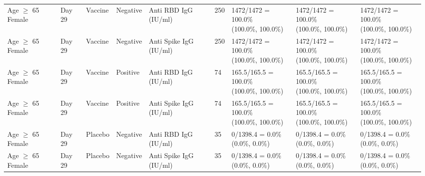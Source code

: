 \documentclass[]{book}
\theoremstyle{definition}
\theoremstyle{definition}
\theoremstyle{definition}
\newcommand{\1}{\mathbbm{1}}
\begin{document}
\begin{landscape}
\begin{ThreePartTable}
\begin{longtable}[t]{>{\raggedright\arraybackslash}p{2.7cm}llllllll}
\hspace{1em}Age $\geq$ 65 Female & Day 29 & Vaccine & Negative & Anti RBD IgG (IU/ml) & 250 & \makecell[l]{1472/1472 = 100.0\%\\(100.0\%, 100.0\%)} & \makecell[l]{1472/1472 = 100.0\%\\(100.0\%, 100.0\%)} & \makecell[l]{1472/1472 = 100.0\%\\(100.0\%, 100.0\%)}\\
\hspace{1em}Age $\geq$ 65 Female & Day 29 & Vaccine & Negative & Anti Spike IgG (IU/ml) & 250 & \makecell[l]{1472/1472 = 100.0\%\\(100.0\%, 100.0\%)} & \makecell[l]{1472/1472 = 100.0\%\\(100.0\%, 100.0\%)} & \makecell[l]{1472/1472 = 100.0\%\\(100.0\%, 100.0\%)}\\
\hspace{1em}Age $\geq$ 65 Female & Day 29 & Vaccine & Positive & Anti RBD IgG (IU/ml) & 74 & \makecell[l]{165.5/165.5 = 100.0\%\\(100.0\%, 100.0\%)} & \makecell[l]{165.5/165.5 = 100.0\%\\(100.0\%, 100.0\%)} & \makecell[l]{165.5/165.5 = 100.0\%\\(100.0\%, 100.0\%)}\\
\hspace{1em}Age $\geq$ 65 Female & Day 29 & Vaccine & Positive & Anti Spike IgG (IU/ml) & 74 & \makecell[l]{165.5/165.5 = 100.0\%\\(100.0\%, 100.0\%)} & \makecell[l]{165.5/165.5 = 100.0\%\\(100.0\%, 100.0\%)} & \makecell[l]{165.5/165.5 = 100.0\%\\(100.0\%, 100.0\%)}\\
\hspace{1em}Age $\geq$ 65 Female & Day 29 & Placebo & Negative & Anti RBD IgG (IU/ml) & 35 & \makecell[l]{0/1398.4 = 0.0\%\\(0.0\%, 0.0\%)} & \makecell[l]{0/1398.4 = 0.0\%\\(0.0\%, 0.0\%)} & \makecell[l]{0/1398.4 = 0.0\%\\(0.0\%, 0.0\%)}\\
\hspace{1em}Age $\geq$ 65 Female & Day 29 & Placebo & Negative & Anti Spike IgG (IU/ml) & 35 & \makecell[l]{0/1398.4 = 0.0\%\\(0.0\%, 0.0\%)} & \makecell[l]{0/1398.4 = 0.0\%\\(0.0\%, 0.0\%)} & \makecell[l]{0/1398.4 = 0.0\%\\(0.0\%, 0.0\%)}\\

\end{longtable}
\end{ThreePartTable}
\end{landscape}
\end{document}
